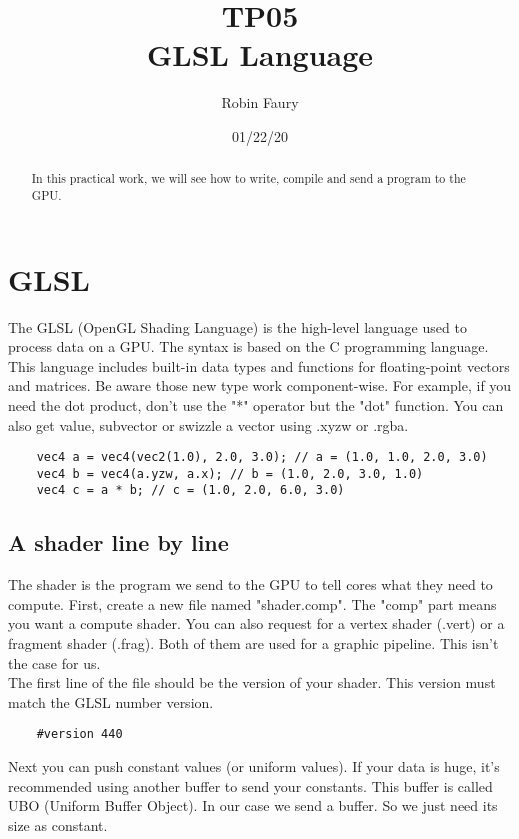 \documentclass{article}
\begin{document}
\title{TP05\\GLSL Language}
\author{Robin Faury}
\date{01/22/20}
\maketitle

\begin{abstract}
	In this practical work, we will see how to write, compile and send a program to the GPU.
\end{abstract}

\section{GLSL}
The GLSL (OpenGL Shading Language) is the high-level language used to process data on a GPU. The syntax is based on the C programming language. This language includes built-in data types and functions for floating-point vectors and matrices. Be aware those new type work component-wise. For example, if you need the dot product, don't use the "*" operator but the "dot" function. You can also get value, subvector or swizzle a vector using .xyzw or .rgba.
\begin{lstlisting}
	vec4 a = vec4(vec2(1.0), 2.0, 3.0); // a = (1.0, 1.0, 2.0, 3.0)
	vec4 b = vec4(a.yzw, a.x); // b = (1.0, 2.0, 3.0, 1.0)
	vec4 c = a * b; // c = (1.0, 2.0, 6.0, 3.0)
\end{lstlisting}

\subsection{A shader line by line}
The shader is the program we send to the GPU to tell cores what they need to compute. First, create a new file named "shader.comp". The "comp" part means you want a compute shader. You can also request for a vertex shader (.vert) or a fragment shader (.frag). Both of them are used for a graphic pipeline. This isn't the case for us.\\
The first line of the file should be the version of your shader. This version must match the GLSL number version.

\begin{lstlisting}
	#version 440
\end{lstlisting}

Next you can push constant values (or uniform values). If your data is huge, it's recommended using another buffer to send your constants. This buffer is called UBO (Uniform Buffer Object). In our case we send a buffer. So we just need its size as constant.
\end{document}
